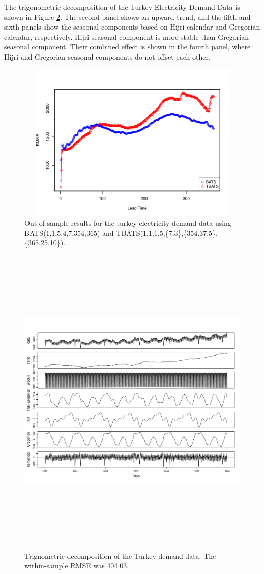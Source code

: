 \documentclass{uwstat572}
\begin{document}
The trigonometric decomposition of the Turkey Electricity Demand Data is shown in Figure \ref{fig:tbatsDecompTelec}. The second panel shows an upward trend, and the fifth and sixth panels show the seasonal components based on Hijri calendar and Gregorian calendar, respectively. Hijri seasonal component is more stable than Gregorian seasonal component. Their combined effect is shown in the fourth panel, where Hijri and Gregorian seasonal components do not offset each other.

\begin{figure}[]
\centering
  \includegraphics[width=6in,height=3in]{telecRMSE.pdf}
  \caption{Out-of-sample results for the turkey electricity demand data using BATS(1,1,5,4,7,354,365) and TBATS(1,1,1,5,\{7,3\},\{354.37,5\},\{365.25,10\}).}
  \label{fig:telecRMSE}
\end{figure}


\begin{figure}[]
\centering
  \includegraphics[width=\linewidth,height=6in]{tbatsDecompTelec.pdf}
  \caption{Trignometric decomposition of the Turkey demand data. The within-sample RMSE was 404.03.}
  \label{fig:tbatsDecompTelec}
\end{figure}
\end{document}
